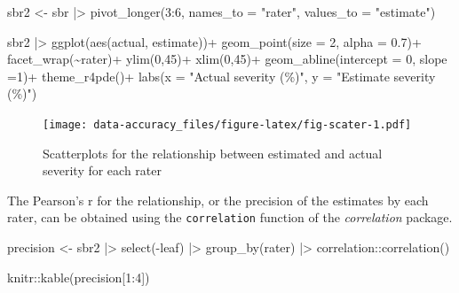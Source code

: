 \documentclass[
  letterpaper,
]{book}
\newenvironment{Shaded}{\begin{snugshade}}{\end{snugshade}}
\newcommand{\AttributeTok}[1]{\textcolor[rgb]{0.40,0.45,0.13}{#1}}
\newcommand{\DecValTok}[1]{\textcolor[rgb]{0.68,0.00,0.00}{#1}}
\newcommand{\FloatTok}[1]{\textcolor[rgb]{0.68,0.00,0.00}{#1}}
\newcommand{\FunctionTok}[1]{\textcolor[rgb]{0.28,0.35,0.67}{#1}}
\newcommand{\NormalTok}[1]{\textcolor[rgb]{0.00,0.23,0.31}{#1}}
\newcommand{\OtherTok}[1]{\textcolor[rgb]{0.00,0.23,0.31}{#1}}
\newcommand{\SpecialCharTok}[1]{\textcolor[rgb]{0.37,0.37,0.37}{#1}}
\newcommand{\StringTok}[1]{\textcolor[rgb]{0.13,0.47,0.30}{#1}}
\begin{document}
\begin{Shaded}
\begin{Highlighting}[]
\NormalTok{sbr2 }\OtherTok{\textless{}{-}}\NormalTok{ sbr }\SpecialCharTok{|\textgreater{}} 
  \FunctionTok{pivot\_longer}\NormalTok{(}\DecValTok{3}\SpecialCharTok{:}\DecValTok{6}\NormalTok{, }\AttributeTok{names\_to =} \StringTok{"rater"}\NormalTok{,}
               \AttributeTok{values\_to =} \StringTok{"estimate"}\NormalTok{) }

\NormalTok{sbr2 }\SpecialCharTok{|\textgreater{}} 
  \FunctionTok{ggplot}\NormalTok{(}\FunctionTok{aes}\NormalTok{(actual, estimate))}\SpecialCharTok{+}
  \FunctionTok{geom\_point}\NormalTok{(}\AttributeTok{size =} \DecValTok{2}\NormalTok{, }\AttributeTok{alpha =} \FloatTok{0.7}\NormalTok{)}\SpecialCharTok{+}
  \FunctionTok{facet\_wrap}\NormalTok{(}\SpecialCharTok{\textasciitilde{}}\NormalTok{rater)}\SpecialCharTok{+}
  \FunctionTok{ylim}\NormalTok{(}\DecValTok{0}\NormalTok{,}\DecValTok{45}\NormalTok{)}\SpecialCharTok{+}
  \FunctionTok{xlim}\NormalTok{(}\DecValTok{0}\NormalTok{,}\DecValTok{45}\NormalTok{)}\SpecialCharTok{+}
  \FunctionTok{geom\_abline}\NormalTok{(}\AttributeTok{intercept =} \DecValTok{0}\NormalTok{, }\AttributeTok{slope =}\DecValTok{1}\NormalTok{)}\SpecialCharTok{+}
  \FunctionTok{theme\_r4pde}\NormalTok{()}\SpecialCharTok{+}
  \FunctionTok{labs}\NormalTok{(}\AttributeTok{x =} \StringTok{"Actual severity (\%)"}\NormalTok{,}
       \AttributeTok{y =} \StringTok{"Estimate severity (\%)"}\NormalTok{)}
\end{Highlighting}
\end{Shaded}

\begin{figure}

\texttt{[image: data-accuracy\_files/figure-latex/fig-scater-1.pdf]} \hfill{}

\caption{\label{fig-scater}Scatterplots for the relationship between
estimated and actual severity for each rater}

\end{figure}

The Pearson's r for the relationship, or the precision of the estimates
by each rater, can be obtained using the \texttt{correlation} function
of the \emph{correlation} package.

\begin{Shaded}
\begin{Highlighting}[]
\NormalTok{precision }\OtherTok{\textless{}{-}}\NormalTok{ sbr2 }\SpecialCharTok{|\textgreater{}} 
  \FunctionTok{select}\NormalTok{(}\SpecialCharTok{{-}}\NormalTok{leaf) }\SpecialCharTok{|\textgreater{}} 
  \FunctionTok{group\_by}\NormalTok{(rater) }\SpecialCharTok{|\textgreater{}} 
\NormalTok{  correlation}\SpecialCharTok{::}\FunctionTok{correlation}\NormalTok{() }

\NormalTok{knitr}\SpecialCharTok{::}\FunctionTok{kable}\NormalTok{(precision[}\DecValTok{1}\SpecialCharTok{:}\DecValTok{4}\NormalTok{])}
\end{Highlighting}
\end{Shaded}
\end{document}
